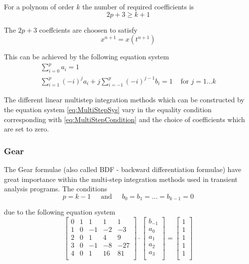 For a polynom of order $k$ the number of required coefficients is
\begin{equation}
\label{eq:MultiStepCondition}
2p + 3 \ge k + 1
\end{equation}

The $2p +3$ coeffcients are choosen to satisfy
\begin{equation}
x^{n+1} = x(t^{n+1})
\end{equation}

This can be achieved by the following equation system
\begin{equation}
\begin{split}
\label{eq:MultiStepSys}
\sum^p_{i=0} a_i = 1\\
\sum^p_{i=1} (-i)^j a_i + j \sum^p_{i=-1} (-i)^{j-1} b_i = 1 & \textrm{ for } j = 1\ldots k
\end{split}
\end{equation}

The different linear multistep integration methods which can be
constructed by the equation system \eqref{eq:MultiStepSys} vary in the
equality condition corresponding with \eqref{eq:MultiStepCondition}
and the choice of coefficients which are set to zero.

\subsubsection{Gear}

The Gear \cite{Gear} formulae (also called BDF - backward
differentiation formulae) have great importance within the multi-step
integration methods used in transient analysis programs.  The
conditions
\begin{equation}
p = k - 1
\;\;\;\; \textrm{ and } \;\;\;\;
b_0 = b_1 = \ldots = b_{k-1} = 0
\end{equation}

due to the following equation system
\begin{equation}
\label{eq:GearCoeff}
\left[\begin{array}{lrrrr}
0 & 1 &  1 &  1 &   1\\
1 & 0 & -1 & -2 &  -3\\
2 & 0 &  1 &  4 &   9\\
3 & 0 & -1 & -8 & -27\\
4 & 0 &  1 & 16 &  81\\
\end{array}\right]
\cdot
\begin{bmatrix}
b_{-1}\\
a_0\\
a_1\\
a_2\\
a_3\\
\end{bmatrix}
=
\begin{bmatrix}
1\\
1\\
1\\
1\\
1\\
\end{bmatrix}
\end{equation}

